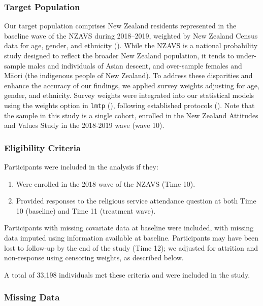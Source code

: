 \documentclass[
  single column]{article}
\providecommand{\tightlist}{%
  \setlength{\itemsep}{0pt}\setlength{\parskip}{0pt}}\usepackage{longtable,booktabs,array}
\begin{document}
\subsubsection{Target Population}\label{target-population}

Our target population comprises New Zealand residents represented in the
baseline wave of the NZAVS during 2018--2019, weighted by New Zealand
Census data for age, gender, and ethnicity
(). While the NZAVS is a national
probability study designed to reflect the broader New Zealand
population, it tends to under-sample males and individuals of Asian
descent, and over-sample females and Māori (the indigenous people of New
Zealand). To address these disparities and enhance the accuracy of our
findings, we applied survey weights adjusting for age, gender, and
ethnicity. Survey weights were integrated into our statistical models
using the weights option in \texttt{lmtp}
(), following
established protocols (). Note that the sample in this study is a single cohort, enrolled
in the New Zealand Attitudes and Values Study in the 2018-2019 wave
(wave 10).

\subsubsection{Eligibility Criteria}\label{eligibility-criteria}

Participants were included in the analysis if they:

\begin{enumerate}
\def\labelenumi{\arabic{enumi}.}
\tightlist
\item
  Were enrolled in the 2018 wave of the NZAVS (Time 10).
\item
  Provided responses to the religious service attendance question at
  both Time 10 (baseline) and Time 11 (treatment wave).
\end{enumerate}

Participants with missing covariate data at baseline were included, with
missing data imputed using information available at baseline.
Participants may have been lost to follow-up by the end of the study
(Time 12); we adjusted for attrition and non-response using censoring
weights, as described below.

A total of 33,198 individuals met these criteria and were included in
the study.

\subsubsection{Missing Data}\label{missing-data}
\end{document}
